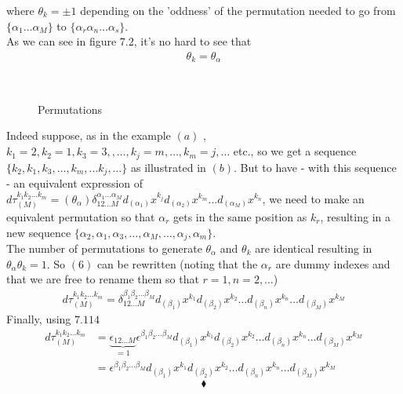 where $\theta_{k}= \pm 1$ depending on the 'oddness' of the permutation needed to go from $\{\alpha_1\dots \alpha_M\}$ to $\{\alpha_r\alpha_n \dots \alpha_s\}$.\\
As we can see in figure $7.2$,  it's no hard to see that 
\begin{align}
\theta_{k}=\theta_{\alpha}
\end{align}
\begin{figure}[H]%
    \centering
    \subfloat[]{}\\
    \subfloat[]{}
\caption{Permutations}
\label{fig:fig_p255}
\end{figure}
Indeed suppose, as in the example $(a)$ ,  $k_1=2, k_2=1,k_3=3, ,\dots ,k_j = m,\dots , k_m=j,\dots$ etc., so we get a sequence $\{k_2, k_1,k_3,\dots, k_m,\dots k_j,\dots\}$ as illustrated in $(b)$. But to have - with this sequence - an equivalent expression of 
$d\tau_{(M)}^{k_1 k_2\dots k_m}=(\theta_{\alpha}) \delta_{1 2 \dots M}^{\alpha_1\dots \alpha_M}d_{(\alpha_1)}x^{k_j}d_{(\alpha_2)}x^{k_m}\dots d_{(\alpha_M)}x^{k_n}$, we need to make an equivalent permutation so that $\alpha_r$ gets in the same position  as $k_r$, resulting in a new sequence $\{\alpha_2,\alpha_1,\alpha_3,\dots,\alpha_M,\dots,\alpha_j, \alpha_m\}$.\\
The number of permutations to generate $\theta_{\alpha}$ and $\theta_k$ are identical resulting in $\theta_{\alpha}\theta_k=1$.
So $(6)$ can be rewritten (noting that the $\alpha_r$ are dummy indexes and that we are free to rename them so that $r=1, n=2,\dots$) 
\begin{align}
d\tau_{(M)}^{k_1 k_2\dots k_m}= \delta_{1 2 \dots M}^{\beta_1\beta_2 \dots \beta_M}d_{(\beta_1)}x^{k_1}d_{(\beta_2)}x^{k_2}\dots d_{(\beta_n)}x^{k_n}\dots d_{(\beta_M)}x^{k_M}
\end{align}
Finally, using $\mathbf{7.114}$ 
\begin{align}
d\tau_{(M)}^{k_1 k_2\dots k_m}&= \underbrace{\epsilon_{1 2 \dots M}}_{=1}\epsilon^{\beta_1\beta_2 \dots \beta_M}d_{(\beta_1)}x^{k_1}d_{(\beta_2)}x^{k_2}\dots d_{(\beta_n)}x^{k_n}\dots d_{(\beta_M)}x^{k_M}\\
&= \epsilon^{\beta_1\beta_2 \dots \beta_M}d_{(\beta_1)}x^{k_1}d_{(\beta_2)}x^{k_2}\dots d_{(\beta_n)}x^{k_n}\dots d_{(\beta_M)}x^{k_M}
\end{align}
$$\blacklozenge$$
\newpage


